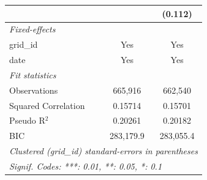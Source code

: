 \begin{tabular}{lcc}
                                                                            &           & (0.112)\\   
   \midrule
   \emph{Fixed-effects}\\
   grid\_id                                                                 & Yes       & Yes\\  
   date                                                                     & Yes       & Yes\\  
   \midrule
   \emph{Fit statistics}\\
   Observations                                                             & 665,916   & 662,540\\  
   Squared Correlation                                                      & 0.15714   & 0.15701\\  
   Pseudo R$^2$                                                             & 0.20261   & 0.20182\\  
   BIC                                                                      & 283,179.9 & 283,055.4\\  
   \midrule \midrule
   \multicolumn{3}{l}{\emph{Clustered (grid\_id) standard-errors in parentheses}}\\
   \multicolumn{3}{l}{\emph{Signif. Codes: ***: 0.01, **: 0.05, *: 0.1}}\\
\end{tabular}
\par\endgroup


